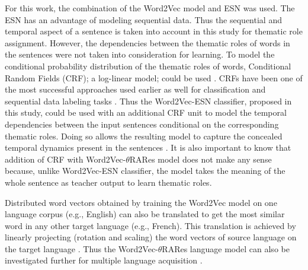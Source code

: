 For this work, the combination of the Word2Vec model and ESN was used. The ESN has an advantage of modeling sequential data. Thus the sequential and temporal aspect of a sentence is taken into account in this study for thematic role assignment. However, the dependencies between the thematic roles of words in the sentences were not taken into consideration for learning. To model the conditional probability distribution of the thematic roles of words, Conditional Random Fields (CRF); a log-linear model; could be used \cite{crf:intro:sutton}. CRFs have been one of the most successful approaches used earlier as well for classification and sequential data labeling tasks \cite{end-to-end, esn:esn_crf}. Thus the Word2Vec-ESN classifier, proposed in this study, could be used with an additional CRF unit to model the temporal dependencies between the input sentences conditional on the corresponding thematic roles. Doing so allows the resulting model to capture the concealed temporal dynamics present in the sentences \cite{esn:esn_crf}. It is also important to know that addition of CRF with Word2Vec-$\theta$RARes model does not make any sense because, unlike Word2Vec-ESN classifier, the model takes the meaning of the whole sentence as teacher output to learn thematic roles. 

Distributed word vectors obtained by training the Word2Vec model on one language corpus (e.g., English) can also be translated to get the most similar word in any other target language (e.g., French). This translation is achieved by linearly projecting (rotation and scaling) the word vectors of source language on the target language \cite{w2v:language_similarities}. Thus the Word2Vec-$\theta$RARes language model can also be investigated further for multiple language acquisition \cite{hinaut_multiple_lang}. 